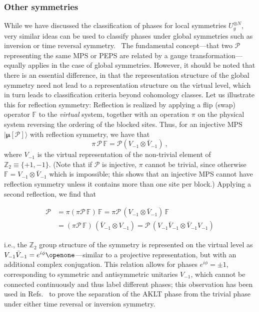 \documentclass[twocolumn,superscriptaddress,prb,linenumbers]{revtex4-1}
\newcommand{\MPS}[1]{| {\bm\mu}[#1]\rangle}
\newcommand{\mc}[1]{\mathcal{#1}}
\newcommand{\flip}{\mathbb{F}}
\begin{document}
\subsubsection{Other symmetries}

While we have discussed the classification of phases for local symmetries
$U_g^{\otimes N}$, very similar ideas can be used to classify phases under
global symmetries such as inversion or time reversal
symmetry.~\cite{pollmann:symprot-1d,pollmann:1d-sym-protection-prb,chen:1d-phases-rg}
The fundamental concept---that two $\mc P$ representing the
same MPS or PEPS are related by a gauge transformation---equally applies
in the case of global symmetries. However, it should be noted that there
is an essential difference, in that the representation structure of the
global symmetry need not lead to a representation structure on the virtual
level, which in turn leads to classification criteria beyond cohomology classes.
Let us illustrate this for reflection symmetry: Reflection is realized by
applying a flip (swap) operator $\flip$ to the \emph{virtual} system,
together with an operation $\pi$ on the physical system reversing the
ordering of the blocked sites.  Thus, for an injective MPS $\MPS{\mc P}$
with reflection symmetry, we have that
\[
    \pi\, \mc P\, \flip = \mc P (V_{-1}\otimes \bar V_{-1})\ ,
\]
where $V_{-1}$ is the virtual representation of the non-trivial element of
$\mathbb Z_2\equiv\{+1,-1\}$.
(Note that if $\mc P$ is injective, $\pi$ cannot be trivial, since
otherwise $\flip=V_{-1}\otimes \bar V_{-1}$ which is impossible; this shows that an
injective MPS cannot have reflection symmetry unless it contains more than
one site per block.)
Applying a second reflection, we find that
\begin{linenomath}
    \begin{align*}
        \mc P & = \pi(\pi\mc P\, \flip)\,\flip
        = \pi\mc P\, (V_{-1}\otimes \bar V_{-1})\,\flip           \\
              & = (\pi\mc P\,\flip) \,(\bar V_{-1}\otimes V_{-1})
        = \mc P\, (V_{-1}\bar V_{-1}\otimes \bar V_{-1}V_{-1})
    \end{align*}
\end{linenomath}
i.e., the $\mathbb Z_2$ group structure of the symmetry is represented on
the virtual level as $V_{-1}\bar V_{-1} = e^{i\phi} \openone$---similar to a
projective representation, but with an additional complex conjugation. This
relation allows for phases $e^{i\phi}=\pm 1$, corresponding to symmetric
and antisymmetric unitaries $V_{-1}$, which cannot be connected continuously and thus
label different phases; this observation has been used in
Refs.~
to prove the separation of the AKLT phase from the trivial phase under either time
reversal or inversion symmetry.
\end{document}
